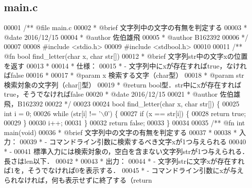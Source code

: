 \subsection{main.\-c}

\begin{DoxyCode}
00001 \textcolor{comment}{/**  @file main.c}
00002 \textcolor{comment}{ *   @brief  文字列中の文字の有無を判定する}
00003 \textcolor{comment}{ *   @date   2016/12/15}
00004 \textcolor{comment}{ *   @author 佐伯雄飛}
00005 \textcolor{comment}{ *   @author B162392}
00006 \textcolor{comment}{ */}
00007 
00008 \textcolor{preprocessor}{#include <stdio.h>}
00009 \textcolor{preprocessor}{#include <stdbool.h>}
00010 \textcolor{comment}{}
00011 \textcolor{comment}{/** @fn bool find\_letter(char x, char str[])}
00012 \textcolor{comment}{ *  @brief  文字列str中の文字xの位置を返す}
00013 \textcolor{comment}{ *}
00014 \textcolor{comment}{ *  仕様：}
00015 \textcolor{comment}{ *  - 文字列中にxが存在すればtrue，なければfalse}
00016 \textcolor{comment}{ *}
00017 \textcolor{comment}{ *  @param  x 検索する文字（char型）}
00018 \textcolor{comment}{ *  @param  str 検索対象の文字列（char[]型）}
00019 \textcolor{comment}{ *  @return bool型．str中にxが存在すればtrue，そうでなければfalse}
00020 \textcolor{comment}{ *  @date   2016/12/15}
00021 \textcolor{comment}{ *  @author 佐伯雄飛，B162392}
00022 \textcolor{comment}{ */}
00023 
00024 \textcolor{keywordtype}{bool} find_letter(\textcolor{keywordtype}{char} x, \textcolor{keywordtype}{char} str[]) \{
00025   \textcolor{keywordtype}{int} i = 0;
00026   \textcolor{keywordflow}{while} (str[i] != \textcolor{charliteral}{'\(\backslash\)0'}) \{
00027     \textcolor{keywordflow}{if} (x == str[i]) \{
00028       \textcolor{keywordflow}{return} \textcolor{keyword}{true};
00029     \}
00030     i++;
00031   \}
00032   \textcolor{keywordflow}{return} \textcolor{keyword}{false};
00033 \}
00034 \textcolor{comment}{}
00035 \textcolor{comment}{/** @fn int main(void)}
00036 \textcolor{comment}{ *  @brief 文字列中の文字の有無を判定する}
00037 \textcolor{comment}{ *}
00038 \textcolor{comment}{ *  入力：}
00039 \textcolor{comment}{ *  - コマンドライン引数に検索するべき文字xが1つ与えられる}
00040 \textcolor{comment}{ *  -}
00041 \textcolor{comment}{標準入力には検索対象の，空白を含まない文字列strが1つ与えられる．長さはlen以下．}
00042 \textcolor{comment}{ *}
00043 \textcolor{comment}{ *  出力：}
00044 \textcolor{comment}{ *  - 文字列strに文字xが存在すれば1を，そうでなければ0を表示する．}
00045 \textcolor{comment}{ *  - コマンドライン引数にxが与えられなければ，何も表示せずに終了する（return}

\end{DoxyCode}
